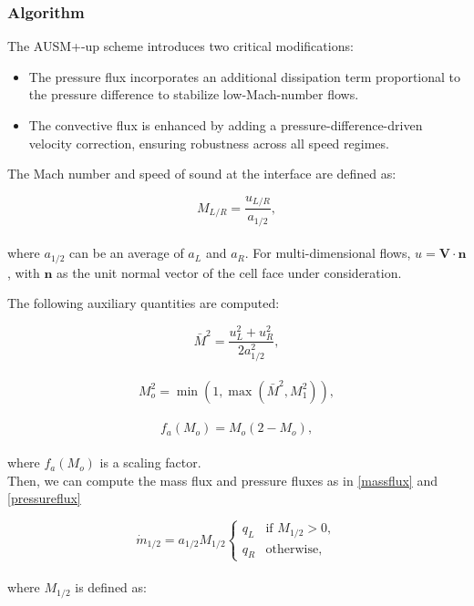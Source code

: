 \documentclass[a5paper]{sapthesis}
\begin{document}
	\subsubsection*{Algorithm}
	The AUSM+-up scheme introduces two critical modifications:
	
	\begin{itemize}
		\item The pressure flux incorporates an additional dissipation term proportional to the pressure difference to stabilize low-Mach-number flows.
		\item 	The convective flux is enhanced by adding a pressure-difference-driven velocity correction, ensuring robustness across all speed regimes.
	\end{itemize} 
	
	\noindent The Mach number and speed of sound at the interface are defined as:
	
	\begin{equation}
		M_{L/R} = \dfrac{u_{L/R}}{a_{1/2}},
	\end{equation}
	\\
	where $a_{1/2}$ can be an average of $a_L$ and $a_R$. For multi-dimensional flows, $u = \mathbf{V} \cdot \mathbf{n}$, with $\mathbf{n}$ as the unit normal vector of the cell face under consideration.
	
	\noindent The following auxiliary quantities are computed:
	
	\begin{equation}
		\bar{M}^2 = \dfrac{u_L^2 + u_R^2}{2a_{1/2}^2},
	\end{equation}
	\\
	\begin{equation}
		M_o^2 = \min(1, \max(\bar{M}^2, M_1^2)),
	\end{equation}
	\\
	\begin{equation}
		f_a(M_o) = M_o (2 - M_o),
	\end{equation}
	\\
	where $f_a(M_o)$ is a scaling factor. \\
	
	\noindent Then, we can compute the mass flux and pressure fluxes as in \ref{massflux} and \ref{pressureflux}
	
	\begin{equation}
		\dot{m}_{1/2} = a_{1/2} M_{1/2} \begin{cases}
			q_L & \text{if } M_{1/2} > 0, \\
			q_R & \text{otherwise},
			\label{massflux}
		\end{cases}
	\end{equation}
	\\
	where $M_{1/2}$ is defined as:
	
\end{document}
